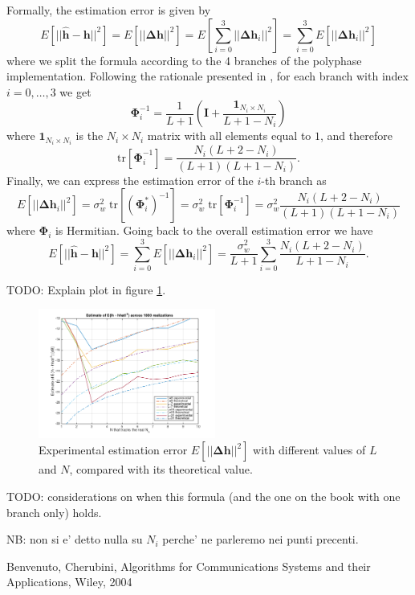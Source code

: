 \documentclass[10pt]{article}
\newcommand{\tr} {\mathrm{tr}}
\numberwithin{equation}{section}
\begin{document}
Formally, the estimation error is given by
$$ E[||\mathbf{\hat{h}}-\mathbf{h}||^2] = E[||\mathbf{\Delta h}||^2] = E[\sum_{i=0}^{3} ||\mathbf{\Delta h}_i||^2] = \sum_{i=0}^{3} E[||\mathbf{\Delta h}_i||^2]$$
where we split the formula according to the 4 branches of the polyphase implementation. Following the rationale presented in \cite{bc}, for each branch with index $i=0,\ldots,3$ we get
$$\mathbf{\Phi}_i^{-1} = \frac{1}{L+1} \left( \mathbf{I} + \frac{\mathbf{1}_{N_i \times N_i}}{L+1-N_i} \right)$$
where $\mathbf{1}_{N_i \times N_i}$ is the $N_i \times N_i$ matrix with all elements equal to $1$, and therefore
$$ \tr [\mathbf{\Phi}_i^{-1}] = \frac{N_i(L+2-N_i)}{(L+1)(L+1-N_i)}. $$
Finally, we can express the estimation error of the $i$-th branch as
$$ E[||\mathbf{\Delta h}_i||^2] = \sigma_w^2 \; \tr [(\mathbf{\Phi}_i^*)^{-1}] = \sigma_w^2 \; \tr [\mathbf{\Phi}_i^{-1}] = \sigma_w^2 \frac{N_i(L+2-N_i)}{(L+1)(L+1-N_i)}$$
where $\mathbf{\Phi}_i$ is Hermitian. Going back to the overall estimation error we have
$$ E[||\mathbf{\hat{h}}-\mathbf{h}||^2] = \sum_{i=0}^{3} E[||\mathbf{\Delta h}_i||^2] = \frac{\sigma_w^2}{L+1} \sum_{i=0}^{3} \frac{N_i (L+2-N_i)}{L+1-N_i}.$$

TODO: Explain plot in figure \ref{fig:p02_comparetheoreticaldeltah}.

\begin{figure}[ht]
	\centering
	\includegraphics[width=0.52\textwidth]{p02_comparetheoreticaldeltah}
	\caption{Experimental estimation error $E[||\mathbf{\Delta h}||^2]$ with different values of $L$ and $N$, compared with its theoretical value.}
    \label{fig:p02_comparetheoreticaldeltah}
\end{figure}

TODO: considerations on when this formula (and the one on the book with one branch only) holds.

NB: non si e' detto nulla su $N_i$ perche' ne parleremo nei punti precenti.


\begin{thebibliography}{10}

Benvenuto, Cherubini, Algorithms for Communications Systems and their Applications, Wiley, 2004


\end{thebibliography}
\end{document}
